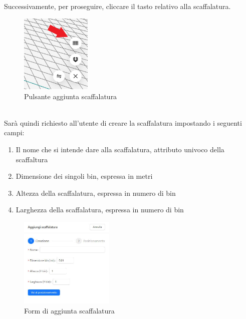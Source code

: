            \noindent Successivamente, per proseguire, cliccare il tasto relativo alla scaffalatura.\\
            \begin{figure}[h!]
                \centering
                \includegraphics[width=0.3\textwidth]{images/aggiunta_scaffalatura.png}
                \caption{Pulsante aggiunta scaffalatura}
            \end{figure}
            \\
            \noindent Sarà quindi richiesto all'utente di creare la scaffalatura impostando i seguenti campi:\\
            \begin{enumerate}
                \item Il nome che si intende dare alla scaffalatura, attributo univoco della scaffaltura
                \item Dimensione dei singoli bin, espressa in metri
                \item Altezza della scaffalatura, espressa in numero di bin
                \item Larghezza della scaffalatura, espressa in numero di bin 
            \end{enumerate}

            \begin{figure}[h!]
                \centering
                \includegraphics[width=0.4\textwidth]{images/creazione_scaffalatura.png}
                \caption{Form di aggiunta scaffalatura}
            \end{figure}

